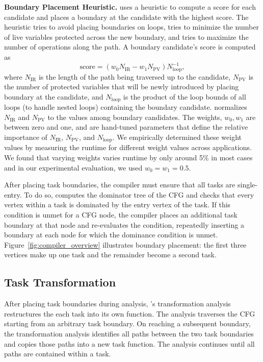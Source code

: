 \textbf{Boundary Placement Heuristic.} \sys uses a heuristic to compute a score for each candidate and places a boundary at the candidate with the highest score. The heuristic tries to avoid placing boundaries on loops, tries to minimize the number of live variables protected across the new boundary, and tries to maximize the number of operations along the path. A boundary candidate's score is computed as
%
\begin{equation}
\text{score} = {\left(w_{0} N_{\text{IR}} - w_{1} N_{\text{PV}}\right)}{N_{\text{loop}}^{-1}},\nonumber
\end{equation}
%
where $N_{\text{IR}}$ is the length of the path being traversed up to the
candidate, $N_{\text{PV}}$ is the number of protected variables that will be
newly introduced by placing boundary at the candidate, and $N_{\text{loop}}$ is
the product of the loop bounds of all loops (to handle nested loops) containing the
boundary candidate. \sys normalizes $N_{\text{IR}}$ and $N_{\text{PV}}$ to the
values among boundary candidates. The weights, $w_{0}, w_{1}$ are between zero
and one, and are hand-tuned parameters that define the relative importance of
$N_{\text{IR}}$, $N_{\text{PV}}$, and $N_{\text{loop}}$. We empirically determined these weight values by measuring the runtime for different weight values across
applications. We found that varying weights varies runtime by only around 5\%
in most cases and in our experimental evaluation, we used $w_{0} = w_{1} =
0.5$.

After placing task boundaries, the compiler must ensure that all tasks are
single-entry. To do so, \sys computes the dominator tree of the CFG and checks
that every vertex within a task is dominated by the entry vertex of the task.
If this condition is unmet for a CFG node, the compiler places an
additional task boundary at that node and re-evaluates the condition, repeatedly
inserting a boundary at each node for which the dominance condition is unmet.
Figure~\ref{fig:compiler_overview} illustrates boundary placement: the first
three vertices make up one task and the remainder become a second task.

\subsection{Task Transformation}
\label{sec:compiler_transform_pass}

After placing task boundaries during analysis, \sys's transformation analysis
restructures the each task into its own function. The analysis traverses the CFG starting from an arbitrary task boundary. On reaching a subsequent boundary, the transformation analysis identifies all paths between the two task boundaries and copies those paths into a new task function. The analysis continues until all paths are contained within a task. 

